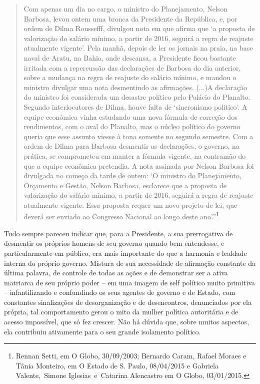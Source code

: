 \asterisc

\begin{quote}
Com apenas um dia no cargo, o ministro do Planejamento, Nelson
Barbosa, levou ontem uma bronca da Presidente da República, e, por ordem
de Dilma Roussefff, divulgou nota em que afirma que `a proposta de
valorização do salário mínimo, a partir de 2016, seguirá a regra de
reajuste atualmente vigente'. Pela manhã, depois de ler os jornais na
praia, na base naval de Aratu, na Bahia, onde descansa, a Presidente
ficou bastante irritada com a repercussão das declarações de Barbosa do
dia anterior, sobre a mudança na regra de reajuste do salário mínimo, e
mandou o ministro divulgar uma nota desmentindo as afirmações. (...)A
declaração do ministro foi considerada um desastre político pelo Palácio
do Planalto. Segundo interlocutores de Dilma, houve falta de
`sincronismo político'. A equipe econômica vinha estudando uma nova
fórmula de correção dos rendimentos, com o aval do Planalto, mas o
núcleo político do governo queria que esse assunto viesse à tona somente
no segundo semestre. Com a ordem de Dilma para Barbosa desmentir as
declarações, o governo, na prática, se comprometeu em manter a fórmula
vigente, na contramão do que a equipe econômica pretendia. A nota
assinada por Nelson Barbosa foi divulgada no começo da tarde de ontem:
`O ministro do Planejamento, Orçamento e Gestão, Nelson Barbosa,
esclarece que a proposta de valorização do salário mínimo, a partir de
2016, seguirá a regra de reajuste atualmente vigente. Essa proposta
requer um novo projeto de lei, que deverá ser enviado ao Congresso
Nacional ao longo deste ano'.''\footnote{Rennan Setti, em O Globo,
  30/09/2003; Bernardo Caram, Rafael Moraes e Tânia Monteiro, em O
  Estado de S. Paulo, 08/04/2015 e Gabriela Valente,~Simone
  Iglesias~e~Catarina Alencastro em O Globo, 03/01/2015.}
\end{quote} 

Tudo sempre pareceu indicar que, para a Presidente, a sua prerrogativa
de desmentir os próprios homens de seu governo quando bem entendesse, e
particularmente em público, era mais importante do que a harmonia e
lealdade interna do próprio governo. Mistura de sua necessidade de
afirmação constante da última palavra, de controle de todas as ações e
de demonstrar ser a ativa matriarca de seu próprio poder -- em uma
imagem de self político muito primitiva -- infantilizando e confundindo
os seus agentes de governo e de Estado, com constantes sinalizações de
desorganização e de desencontros, denunciados por ela própria, tal
comportamento gerou o mito da mulher política autoritária e de acesso
impossível, que só fez crescer. Não há dúvida que, sobre muitos
aspectos, ela contribuiu ativamente para o seu grande isolamento
político.

